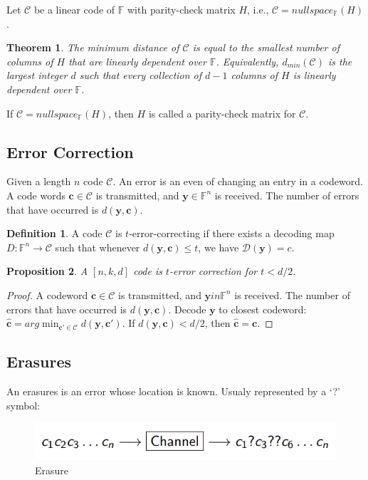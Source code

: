 \documentclass[12pt, oneside]{book}
\newtheorem{theorem}{Theorem}[section]
\newtheorem{proposition}[theorem]{Proposition}
\theoremstyle{definition}
\newtheorem{definition}{Definition}[section]
\theoremstyle{definition}
\theoremstyle{remark}
\begin{document}
Let $\mathcal{C}$ be a linear code of $\mathbb{F}$ with parity-check matrix $H$, i.e., $\mathcal{C}=nullspace_{\mathbb{F}}(H)$.

\begin{theorem}
    The minimum distance of $\mathcal{C}$ is equal to the smallest number of columns of $H$ that are linearly dependent over $\mathbb{F}$. Equivalently, $d_{min}(\mathcal{C})$ is the largest integer $d$ such that every collection of $d-1$ columns of $H$ is linearly dependent over $\mathbb{F}$.
\end{theorem}

If $\mathcal{C}=nullspace_{\mathbb{F}}(H)$, then $H$ is called a parity-check matrix for $\mathcal{C}$.

\subsection{Error Correction}
Given a length $n$ code $\mathcal{C}$. An error is an even of changing an entry in a codeword. A code words $\mathbf{c}\in\mathcal{C}$ is transmitted, and $\mathbf{y}\in\mathbb{F}^n$ is received. The number of errors that have occurred is $d(\mathbf{y},\mathbf{c})$.
\begin{definition}
    A code $\mathcal{C}$ is $t$-error-correcting if there exists a decoding map $ D:\mathbb{F}^n\rightarrow \mathcal{C}$ such that whenever $d(\mathbf{y},\mathbf{c})\leq t$, we have $\mathcal{D}(\mathbf{y})=c$.
\end{definition}

\begin{proposition}
    A $[n,k,d]$ code is $t$-error correction for $t<d/2$.
\end{proposition}
\begin{proof}
    A codeword $\mathbf{c}\in\mathcal{C}$ is transmitted, and $\mathbf{y}in\mathbb{F}^n$ is received. The number of errors that have occurred is $d(\mathbf{y},\mathbf{c})$. Decode $\mathbf{y}$ to closest codeword: $\hat{\mathbf{c}}=arg \min_{\mathbf{c'}\in\mathcal{C}}d(\mathbf{y},\mathbf{c'})$. If $d(\mathbf{y},\mathbf{c})<d/2$, then $\hat{\mathbf{c}}=\mathbf{c}$.
\end{proof}

\subsection{Erasures}
An erasures is an error whose location is known. Usualy represented by a `?' symbol:
\begin{figure}[h]
    \centering
    \includegraphics[width=0.5\linewidth]{Images/erasure.png}
    \caption{Erasure}
\end{figure}
\end{document}
